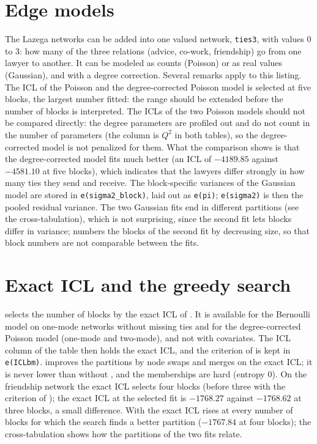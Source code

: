 \section{Edge models}
The Lazega networks can be added into one valued network, \texttt{ties3}, with values 0 to 3: how many of the three relations (advice, co-work, friendship) go from one lawyer to another. It can be modeled as counts (Poisson) or as real values (Gaussian), and with a degree correction.
Several remarks apply to this listing. The ICL of the Poisson and the degree-corrected Poisson model is selected at five blocks, the largest number fitted: the range should be extended before the number of blocks is interpreted. The ICLs of the two Poisson models should not be compared directly: the degree parameters are profiled out and do not count in the number of parameters (the column is $Q^2$ in both tables), so the degree-corrected model is not penalized for them. What the comparison shows is that the degree-corrected model fits much better (an ICL of $-4189.85$ against $-4581.10$ at five blocks), which indicates that the lawyers differ strongly in how many ties they send and receive. The block-specific variances of the Gaussian model are stored in \texttt{e(sigma2\_block)}, laid out as \texttt{e(pi)}; \texttt{e(sigma2)} is then the pooled residual variance. The two Gaussian fits end in different partitions (see the cross-tabulation), which is not surprising, since the second fit lets blocks differ in variance;  numbers the blocks of the second fit by decreasing size, so that block numbers are not comparable between the fits.

\section{Exact ICL and the greedy search}
 selects the number of blocks by the exact ICL of \greed{}. It is available for the Bernoulli model on one-mode networks without missing ties and for the degree-corrected Poisson model (one-mode and two-mode), and not with covariates. The ICL column of the table then holds the exact ICL, and the criterion of \blockmodels{} is kept in \texttt{e(ICLbm)}.  improves the partitions by node swaps and merges on the exact ICL; it is never lower than without , and the memberships are hard (entropy 0).
On the friendship network the exact ICL selects four blocks (before three with the criterion of \blockmodels{}); the exact ICL at the selected fit is $-1768.27$ against $-1768.62$ at three blocks, a small difference. With  the exact ICL rises at every number of blocks for which the search finds a better partition ($-1767.84$ at four blocks); the cross-tabulation shows how the partitions of the two fits relate.


